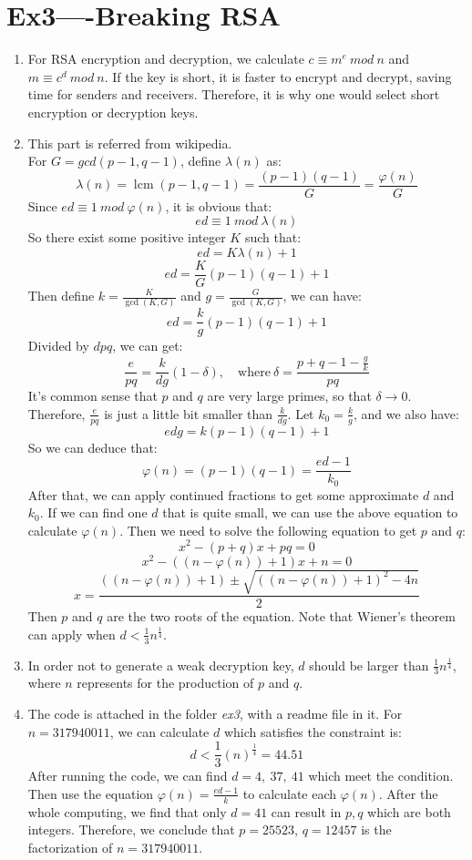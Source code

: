 \documentclass[12pt, a4paper]{article}
\begin{document}
\section*{Ex3----Breaking RSA}
\begin{enumerate}
    \item For RSA encryption and decryption, we calculate $c \equiv m^e\ mod\ n$ and $m \equiv c^d\ mod\ n$. 
          If the key is short, it is faster to encrypt and decrypt, saving time for senders and receivers. 
          Therefore, it is why one would select short encryption or decryption keys.
    \item This part is referred from wikipedia.\\
          For $G = gcd(p-1, q-1)$, define $\lambda(n)$ as:
          $$\lambda(n) = \operatorname{lcm}(p-1, q-1) = \frac{(p-1)(q-1)}{G} = \frac{\varphi(n)}{G}$$
          Since $ed \equiv 1\ mod\ \varphi(n)$, it is obvious that:
          $$ed \equiv 1\ mod\ \lambda(n)$$
          So there exist some positive integer $K$ such that:
          $$ed = K\lambda(n) + 1$$
          $$ed = \frac{K}{G}(p-1)(q-1) + 1$$
          Then define $k = \frac{K}{\operatorname{gcd}(K,G)}$ and $g = \frac{G}{\operatorname{gcd}(K,G)}$, 
          we can have: 
          $$ed = \frac{k}{g}(p-1)(q-1) + 1$$
          Divided by $dpq$, we can get:
          $$\frac{e}{pq} = \frac{k}{dg}(1-\delta),\quad \text{where}\ \delta = \frac{p+q-1-\frac{g}{k}}{pq}$$
          It's common sense that $p$ and $q$ are very large primes, so that $\delta \rightarrow 0$. 
          Therefore, $\frac{e}{pq}$ is just a little bit smaller than $\frac{k}{dg}$. 
          Let $k_0 = \frac{k}{g}$, and we also have:
          $$edg = k(p-1)(q-1) + 1$$
          So we can deduce that:
          $$\varphi(n) = (p-1)(q-1) = \frac{ed - 1}{k_0}$$
          After that, we can apply continued fractions to get some approximate $d$ and $k_0$. 
          If we can find one $d$ that is quite small, we can use the above equation to calculate $\varphi(n)$. 
          Then we need to solve the following equation to get $p$ and $q$:
          $$x^2 - (p+q)x + pq = 0$$
          $$x^2 - ((n - \varphi(n)) + 1)x + n = 0$$
          $$x = \frac{((n - \varphi(n)) + 1) \pm \sqrt{((n - \varphi(n)) + 1)^2 - 4n}}{2}$$
          Then $p$ and $q$ are the two roots of the equation.
          Note that Wiener's theorem can apply when $d < \frac{1}{3}n^{\frac{1}{4}}$.
    \item In order not to generate a weak decryption key, $d$ should be larger than $\frac{1}{3}n^{\frac{1}{4}}$, 
          where $n$ represents for the production of $p$ and $q$.
    \item The code is attached in the folder \emph{ex3}, with a readme file in it. 
          For $n = 317940011$, we can calculate $d$ which satisfies the constraint is:
          $$d < \frac{1}{3}(n)^{\frac{1}{4}} = 44.51$$
          After running the code, we can find $d = 4,\ 37,\ 41$ which meet the condition. 
          Then use the equation $\varphi(n) = \frac{ed-1}{k}$ to calculate each $\varphi(n)$.
          After the whole computing, we find that only $d = 41$ can result in $p,q$ which are both integers. 
          Therefore, we conclude that $p = 25523$, $q = 12457$ is the factorization of $n = 317940011$.


\end{enumerate}
\end{document}
